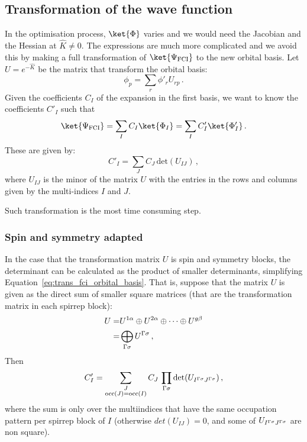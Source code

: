 \documentclass[a4paper,11pt]{article}
\begin{document}
\subsection{Transformation of the wave function}
In the optimisation process, $\ket{\Phi}$ varies and we would need the Jacobian and the Hessian at $\hat{K} \ne 0$.
The expressions are much more complicated and we avoid this by making a full transformation of $\ket{\Psi_\text{FCI}}$ to the new orbital basis.
Let $U = e^{-\hat{K}}$ be the matrix that transform the orbital basis:
\begin{equation}
  \phi_p = \sum_r \phi'_r U_{rp}\,.
\end{equation}
Given the coefficients $C_I$ of the expansion in the first basis, we want to know the coefficients $C'_I$ such that
\begin{equation}
  \ket{\Psi_\text{FCI}} = \sum_I C_I \ket{\Phi_I} = \sum_I C'_I \ket{\Phi'_I}\,.
\end{equation}
These are given by:
\begin{equation}\label{eq:trans_fci_orbital_basis}
  C'_I = \sum_J C_J\, \text{det}(U_{IJ})\,,
\end{equation}
where $U_{IJ}$ is the minor of the matrix $U$ with the entries in the rows and columns given by the multi-indices $I$ and $J$.

Such transformation is the most time consuming step.

\subsubsection{Spin and symmetry adapted}

In the case that the transformation matrix $U$ is spin and symmetry blocks, the determinant can be calculated as the product of smaller determinants, simplifying Equation~\eqref{eq:trans_fci_orbital_basis}.
That is, suppose that the matrix $U$ is given as the direct sum of smaller square matrices (that are the transformation matrix in each spirrep block):
\begin{equation}
  \begin{split}
    U =& U^{1\alpha} \oplus U^{2\alpha} \oplus \dots \oplus U^{g\beta}\\
    =& \bigoplus_{\Gamma \sigma} U^{\Gamma\sigma}\,,
  \end{split}
\end{equation}
Then 
\begin{equation}\label{eq:trans_fci_orbital_basis_sym}
  C'_I = \sum_{\substack{J\\\text{occ}(J) = \text{occ}(I)}}
  C_J\, \prod_{\Gamma\sigma} \text{det}(U_{I^{\Gamma\sigma}J^{\Gamma\sigma}})\,,
\end{equation}
where the sum is only over the multiindices that have the same occupation pattern per spirrep block of $I$ (otherwise $det(U_{IJ}) = 0$, and some of $U_{I^{\Gamma\sigma}J^{\Gamma\sigma}}$ are non square).
\end{document}

